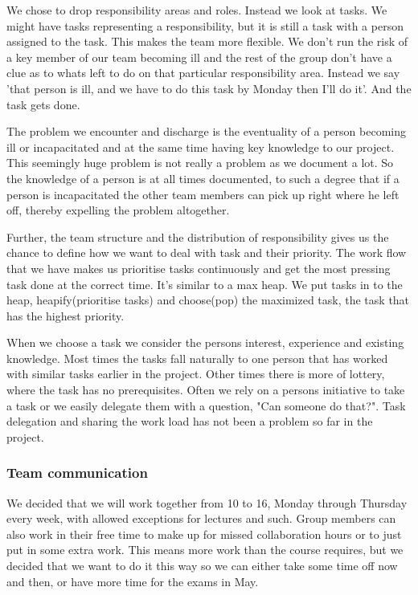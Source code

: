     We chose to drop responsibility areas and roles. Instead we look at tasks. We might have tasks representing a responsibility, but it is still a task with a person assigned to the task. This makes the team more flexible. We don't run the risk of a key member of our team becoming ill and the rest of the group don't have a clue as to whats left to do on that particular responsibility area. Instead we say 'that person is ill, and we have to do this task by Monday then I'll do it'. And the task gets done.
    
    The problem we encounter and discharge is the eventuality of a person becoming ill or incapacitated and at the same time having key knowledge to our project. This seemingly huge problem is not really a problem as we document a lot. So the knowledge of a person is at all times documented, to such a degree that if a person is incapacitated the other team members can pick up right where he left off, thereby expelling the problem altogether. 
    
    Further, the team structure and the distribution of responsibility gives us the chance to define how we want to deal with task and their priority. The work flow that we have makes us prioritise tasks continuously and get the most pressing task done at the correct time. It's similar to a max heap. We put tasks in to the heap, heapify(prioritise tasks) and choose(pop) the maximized task, the task that has the highest priority. 
    
    When we choose a task we consider the persons interest, experience and existing knowledge. Most times the tasks fall naturally to one person that has worked with similar tasks earlier in the project. Other times there is more of lottery, where the task has no prerequisites. Often we rely on a persons initiative to take a task or we easily delegate them with a question, "Can someone do that?". Task delegation and sharing the work load has not been a problem so far in the project.
    
    
    \subsubsection {Team communication}
    We decided that we will work together from 10 to 16, Monday through Thursday every week, with allowed exceptions for lectures and such. Group members can also work in their free time to make up for missed collaboration hours or to just put in some extra work. This means more work than the course requires, but we decided that we want to do it this way so we can either take some time off now and then, or have more time for the exams in May.

